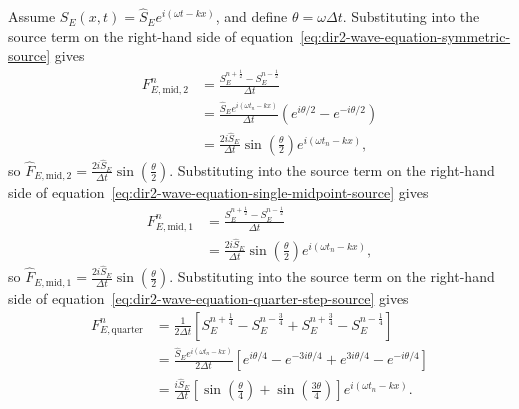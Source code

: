 \documentclass{article}
\numberwithin{figure}{section}
\begin{document}
Assume $S_E(x,t)=\widehat{S}_Ee^{i(\omega t-kx)}$, and define $\theta=\omega\Delta t$. Substituting into the source term on the right-hand side of equation~\eqref{eq:dir2-wave-equation-symmetric-source} gives
\begin{equation}
    \begin{aligned} F_{E,\mathrm{mid,2}}^n & =\frac{S_E^{n+\frac{1}{2}}-S_E^{n-\frac{1}{2}}}{\Delta t}                                      \\
                                     & =\frac{\widehat{S}_Ee^{i(\omega t_n-kx)}}{\Delta t}\left(e^{i\theta/2}-e^{-i\theta/2}\right) \\
                                     & =\frac{2i\widehat{S}_E}{\Delta t}\sin\left(\frac{\theta}{2}\right)e^{i(\omega t_n-kx)},
    \end{aligned} \label{eq:dir2-midpoint-both-source-amplitude}
\end{equation}
so $\widehat{F}_{E,\mathrm{mid,2}}=\frac{2i\widehat{S}_E}{\Delta t}\sin\left(\frac{\theta}{2}\right)$.
Substituting into the source term on the right-hand side of equation~\eqref{eq:dir2-wave-equation-single-midpoint-source} gives
\begin{equation}
    \begin{aligned} F_{E,\mathrm{mid,1}}^n & =\frac{S_E^{n+\frac{1}{2}}-S_E^{n-\frac{1}{2}}}{\Delta t}                                      \\
                                     & =\frac{2i\widehat{S}_E}{\Delta t}\sin\left(\frac{\theta}{2}\right)e^{i(\omega t_n-kx)},
    \end{aligned} \label{eq:dir2-midpoint-source-amplitude}
\end{equation}
so $\widehat{F}_{E,\mathrm{mid,1}}=\frac{2i\widehat{S}_E}{\Delta t}\sin\left(\frac{\theta}{2}\right)$.
Substituting into the source term on the right-hand side of equation~\eqref{eq:dir2-wave-equation-quarter-step-source} gives
\begin{equation}
    \begin{aligned} F_{E,\mathrm{quarter}}^n & =\frac{1}{2\Delta t}\left[S_E^{n+\frac{1}{4}}-S_E^{n-\frac{3}{4}}+S_E^{n+\frac{3}{4}}-S_E^{n-\frac{1}{4}}\right] \\
                                       & =\frac{\widehat{S}_Ee^{i(\omega t_n-kx)}}{2\Delta t}\left[e^{i\theta/4}-e^{-3i\theta/4}+e^{3i\theta/4}-e^{-i\theta/4}\right]                           \\
                                       & =\frac{i\widehat{S}_E}{\Delta t}\left[\sin\left(\frac{\theta}{4}\right)+\sin\left(\frac{3\theta}{4}\right)\right]e^{i(\omega t_n-kx)}.
    \end{aligned} \label{eq:dir2-quarter-source-amplitude}
\end{equation}
\end{document}
